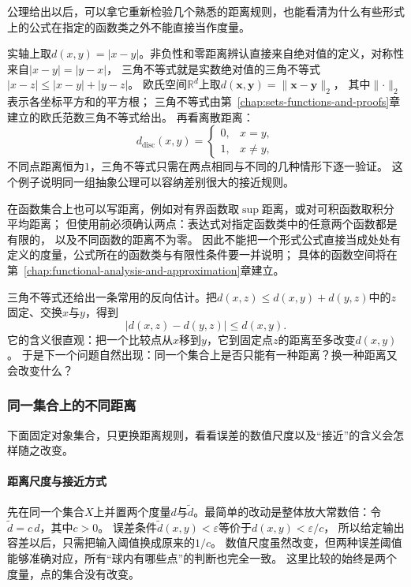 公理给出以后，可以拿它重新检验几个熟悉的距离规则，也能看清为什么有些形式上的公式在指定的函数类之外不能直接当作度量。

实轴上取$d(x,y)=|x-y|$。非负性和零距离辨认直接来自绝对值的定义，对称性来自$|x-y|=|y-x|$，
三角不等式就是实数绝对值的三角不等式$|x-z|\leq|x-y|+|y-z|$。
欧氏空间$\mathbb R^d$上取$d(\bm{x},\bm{y})=\lVert\bm{x}-\bm{y}\rVert_2$，
其中$\lVert\cdot\rVert_2$表示各坐标平方和的平方根；
三角不等式由第~\ref{chap:sets-functions-and-proofs}章建立的欧氏范数三角不等式给出。
再看离散距离：
\[
  d_{\mathrm{disc}}(x,y)=
  \begin{cases}0,&x=y,\\1,&x\neq y,\end{cases}
\]
不同点距离恒为$1$，三角不等式只需在两点相同与不同的几种情形下逐一验证。
这个例子说明同一组抽象公理可以容纳差别很大的接近规则。

在函数集合上也可以写距离，例如对有界函数取$\sup$距离，或对可积函数取积分平均距离；
但使用前必须确认两点：表达式对指定函数类中的任意两个函数都是有限的，
以及不同函数的距离不为零。
因此不能把一个形式公式直接当成处处有定义的度量，公式所在的函数类与有限性条件要一并说明；
具体的函数空间将在第~\ref{chap:functional-analysis-and-approximation}章建立。

三角不等式还给出一条常用的反向估计。把$d(x,z)\leq d(x,y)+d(y,z)$中的$z$固定、交换$x$与$y$，得到
\begin{equation}
\label{eq:metric-reverse-triangle}
  \bigl|d(x,z)-d(y,z)\bigr|\leq d(x,y).
\end{equation}
它的含义很直观：把一个比较点从$x$移到$y$，它到固定点$z$的距离至多改变$d(x,y)$。
于是下一个问题自然出现：同一个集合上是否只能有一种距离？换一种距离又会改变什么？

\subsubsection{同一集合上的不同距离}
\label{sec:metric-choice-of-metric}

下面固定对象集合，只更换距离规则，看看误差的数值尺度以及“接近”的含义会怎样随之改变。

\paragraph{距离尺度与接近方式}

先在同一个集合$X$上并置两个度量$d$与$\widetilde d$。最简单的改动是整体放大常数倍：令$\widetilde d=c\,d$，其中$c>0$。
误差条件$\widetilde d(x,y)<\varepsilon$等价于$d(x,y)<\varepsilon/c$，
所以给定输出容差以后，只需把输入阈值换成原来的$1/c$。
数值尺度虽然改变，但两种误差阈值能够准确对应，所有“球内有哪些点”的判断也完全一致。
这里比较的始终是两个度量，点的集合没有改变。

